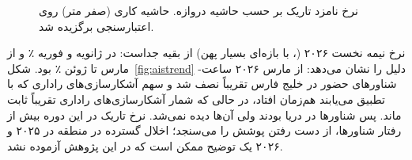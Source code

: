 \begin{figure}[htbp]
\centering
{}
\caption[نرخ تاریک بر حسب حاشیه دروازه]{نرخ نامزد تاریک بر حسب حاشیه دروازه. حاشیه کاری (صفر متر) روی اعتبارسنجی برگزیده
شد.}
\label{fig:margin}
\end{figure}

نرخ نیمه نخست ۲۰۲۶ (\darkUaeEarly{}، با بازه‌ای بسیار پهن) از بقیه جداست: در ژانویه و فوریه
٪ و از مارس تا ژوئن ٪ بود. شکل~\ref{fig:aistrend} دلیل را نشان می‌دهد: از مارس
۲۰۲۶ ساعت-شناورهای حضور  در خلیج فارس تقریباً نصف شد و سهم آشکارسازی‌های راداری
 که با  تطبیق می‌یابند هم‌زمان افتاد، در حالی که شمار آشکارسازی‌های راداری
تقریباً ثابت ماند. پس شناورها در دریا بودند ولی  آن‌ها دیده نمی‌شد. نرخ تاریک در این دوره بیش
از رفتار شناورها، از دست رفتن پوشش  را می‌سنجد؛ اخلال گسترده  در منطقه در
۲۰۲۵ و ۲۰۲۶ یک توضیح ممکن است که در این پژوهش آزموده نشد.

